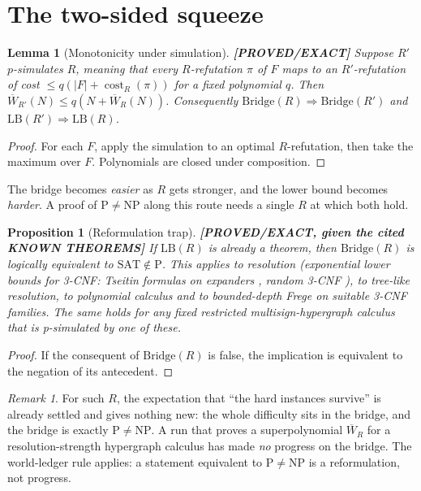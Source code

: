 \documentclass[11pt]{article}
\newtheorem{lemma}[theorem]{Lemma}
\newtheorem{proposition}[theorem]{Proposition}
\theoremstyle{definition}
\theoremstyle{remark}
\newtheorem*{remark}{Remark}
\newcommand{\SAT}{\mathrm{SAT}}
\newcommand{\cost}{\operatorname{cost}}
\newcommand{\Wb}{\overline W}
\newcommand{\status}[1]{\textbf{[#1]}}
\begin{document}
\section{The two-sided squeeze}\label{sec:squeeze}

\begin{lemma}[Monotonicity under simulation]\label{lem:mono}
\status{PROVED/EXACT} Suppose $R'$ $p$-simulates $R$, meaning that every
$R$-refutation $\pi$ of $F$ maps to an $R'$-refutation of cost
$\le q(|F|+\cost_R(\pi))$ for a fixed polynomial $q$. Then
$\Wb_{R'}(N)\le q(N+\Wb_R(N))$. Consequently
$\mathrm{Bridge}(R)\Rightarrow\mathrm{Bridge}(R')$ and
$\mathrm{LB}(R')\Rightarrow\mathrm{LB}(R)$.
\end{lemma}
\begin{proof}
For each $F$, apply the simulation to an optimal $R$-refutation, then take the
maximum over $F$. Polynomials are closed under composition.
\end{proof}

The bridge becomes \emph{easier} as $R$ gets stronger, and the lower bound
becomes \emph{harder}. A proof of $\mathrm P\ne\mathrm{NP}$ along this route
needs a single $R$ at which both hold.

\begin{proposition}[Reformulation trap]\label{prop:trap}
\status{PROVED/EXACT, given the cited KNOWN THEOREMS} If $\mathrm{LB}(R)$ is
already a theorem, then $\mathrm{Bridge}(R)$ is logically equivalent to
$\SAT\notin\mathrm P$. This applies to resolution (exponential lower bounds
for 3-CNF: Tseitin formulas on expanders \cite{urquhart1987}, random 3-CNF
\cite{chvatalszemeredi1988,bsw2001}), to tree-like resolution, to polynomial
calculus and to bounded-depth Frege on suitable 3-CNF families. The same
holds for any fixed restricted multisign-hypergraph calculus that is
p-simulated by one of these.
\end{proposition}
\begin{proof}
If the consequent of $\mathrm{Bridge}(R)$ is false, the implication is
equivalent to the negation of its antecedent.
\end{proof}

\begin{remark}
For such $R$, the expectation that ``the hard instances survive'' is
already settled and gives nothing new: the whole difficulty sits in the
bridge, and the bridge is exactly $\mathrm P\ne\mathrm{NP}$. A run that proves
a superpolynomial $\Wb_R$ for a resolution-strength hypergraph calculus has
made \emph{no} progress on the bridge. The world-ledger rule applies: a
statement equivalent to $\mathrm P\ne\mathrm{NP}$ is a reformulation, not
progress.
\end{remark}
\end{document}
